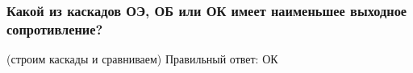 \subsubsection{Какой из каскадов ОЭ, ОБ или ОК имеет наименьшее выходное сопротивление?}
(строим каскады и сравниваем)
Правильный ответ: ОК
